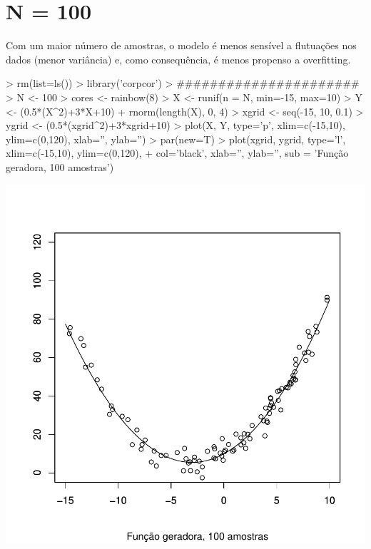 \documentclass{article}
\begin{document}
\section{N = 100}
Com um maior número de amostras, o modelo é menos sensível a flutuações nos dados (menor variância) e, como consequência, é menos propenso a overfitting.
\begin{Schunk}
\begin{Sinput}
> rm(list=ls())
> library('corpcor')
> ######################
> N <- 100
> cores <- rainbow(8)
> X <- runif(n = N, min=-15, max=10)
> Y <- (0.5*(X^2)+3*X+10) + rnorm(length(X), 0, 4)
> xgrid <- seq(-15, 10, 0.1)
> ygrid <- (0.5*(xgrid^2)+3*xgrid+10)
> plot(X, Y, type='p', xlim=c(-15,10), ylim=c(0,120), xlab='', ylab='')
> par(new=T)
> plot(xgrid, ygrid, type='l', xlim=c(-15,10), ylim=c(0,120), 
+      col='black', xlab='', ylab='', sub = 'Função geradora, 100 amostras')
\end{Sinput}
\end{Schunk}
\includegraphics{aprox-010}
\end{document}
